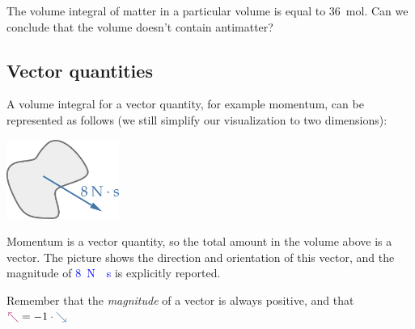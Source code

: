 \documentclass[a4paper,12pt,%
onecolumn,oneside,titlepage,%
british%
]{memoir}
\renewcommand*{\|}[1][]{\nonscript\:#1\vert\nonscript\:\mathopen{}}
\begin{document}
\bigskip

\begin{exercise}
  The volume integral of matter in a particular volume is equal to \qty{36}{mol}. Can we conclude that the volume doesn't contain antimatter?
\end{exercise}


\subsection{Vector quantities}

A volume integral for a vector quantity, for example momentum, can be represented as follows (we still simplify our visualization to two dimensions):
\begin{center}
  \includegraphics[height=7em]{volumeintegral_8Ns.pdf}
\end{center}
Momentum is a vector quantity, so the total amount in the volume above is a vector. The picture shows the direction and orientation of this vector, and the magnitude of \textcolor{blue}{\qty{8}{N\cdot s}}
is explicitly reported.
\begin{warning}
  Remember that the \emph{magnitude} of a vector is always positive, and that\quad $\mathord{\mathcolor{purple}{\nwarrow}} = -1\cdot\mathord{\mathcolor{blue}{\searrow}}$
\end{warning}
\end{document}
